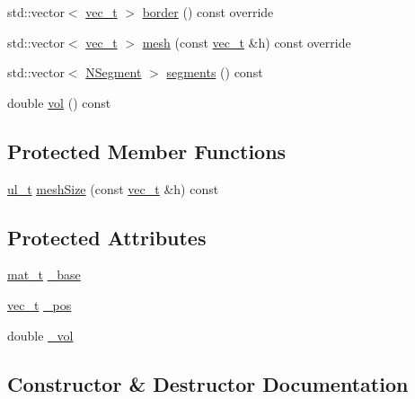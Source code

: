\begin{DoxyCompactItemize}
\item 
std\+::vector$<$ \mbox{\hyperlink{_n_vector_8h_a0a2cfc67e738a3d73e4f12098c4c07f6}{vec\+\_\+t}} $>$ \mbox{\hyperlink{class_n_parallelepiped_a6cc531927e40a95b48923b56406206d3}{border}} () const override
\item 
std\+::vector$<$ \mbox{\hyperlink{_n_vector_8h_a0a2cfc67e738a3d73e4f12098c4c07f6}{vec\+\_\+t}} $>$ \mbox{\hyperlink{class_n_parallelepiped_a0f9ba9f6cab5d2c9472776e69f9aa78d}{mesh}} (const \mbox{\hyperlink{_n_vector_8h_a0a2cfc67e738a3d73e4f12098c4c07f6}{vec\+\_\+t}} \&h) const override
\item 
std\+::vector$<$ \mbox{\hyperlink{class_n_segment}{N\+Segment}} $>$ \mbox{\hyperlink{class_n_parallelepiped_a3440b48cfd7491ed747690a9f69dbbe4}{segments}} () const
\item 
double \mbox{\hyperlink{class_n_parallelepiped_a8529874bae044bdee3e0d805dae1887d}{vol}} () const
\end{DoxyCompactItemize}
\subsection*{Protected Member Functions}
\begin{DoxyCompactItemize}
\item 
\mbox{\hyperlink{group___n_algebra_ga1b140a2034db3f5dfe18a987745df43a}{ul\+\_\+t}} \mbox{\hyperlink{class_n_parallelepiped_a99696422faefb6e2f558c794017c95e4}{mesh\+Size}} (const \mbox{\hyperlink{_n_vector_8h_a0a2cfc67e738a3d73e4f12098c4c07f6}{vec\+\_\+t}} \&h) const
\end{DoxyCompactItemize}
\subsection*{Protected Attributes}
\begin{DoxyCompactItemize}
\item 
\mbox{\hyperlink{_n_p_matrix_8h_a44dfb60c1e03b44e98a332fb2ae71947}{mat\+\_\+t}} \mbox{\hyperlink{class_n_parallelepiped_a02542ae7d5e1d052412eb06a292e0e9d}{\+\_\+base}}
\item 
\mbox{\hyperlink{_n_vector_8h_a0a2cfc67e738a3d73e4f12098c4c07f6}{vec\+\_\+t}} \mbox{\hyperlink{class_n_parallelepiped_ae1cc22beb853095d8a110c641dd8e005}{\+\_\+pos}}
\item 
double \mbox{\hyperlink{class_n_parallelepiped_aabd33c4ffeff864ea342440c08d4702b}{\+\_\+vol}}
\end{DoxyCompactItemize}


\subsection{Constructor \& Destructor Documentation}
\mbox{\label{class_n_parallelepiped_af80601a4fc3edfeca3e7f1209cc2b704}} 
